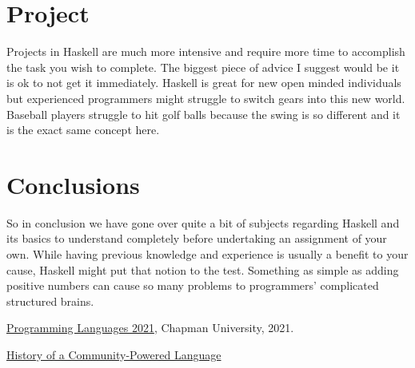 \documentclass{article}
\begin{document}
\section{Project}

Projects in Haskell are much more intensive and require more time to accomplish the task you wish to complete. The biggest piece of advice I suggest would be it is ok to not get it immediately. Haskell is great for new open minded individuals but experienced programmers might struggle to switch gears into this new world. Baseball players struggle to hit golf balls because the swing is so different and it is the exact same concept here. 

\section{Conclusions}\label{conclusions}

So in conclusion we have gone over quite a bit of subjects regarding Haskell and its basics to understand completely before undertaking an assignment of your own. While having previous knowledge and experience is usually a benefit to your cause, Haskell might put that notion to the test. Something as simple as adding positive numbers can cause so many problems to programmers' complicated structured brains. 

\begin{thebibliography}{99}
 \href{https://github.com/alexhkurz/programming-languages-2021/blob/main/README.md}{Programming Languages 2021}, Chapman University, 2021.

\href{https://serokell.io/blog/haskell-history}{History of a Community-Powered Language}
\end{thebibliography}
\end{document}
